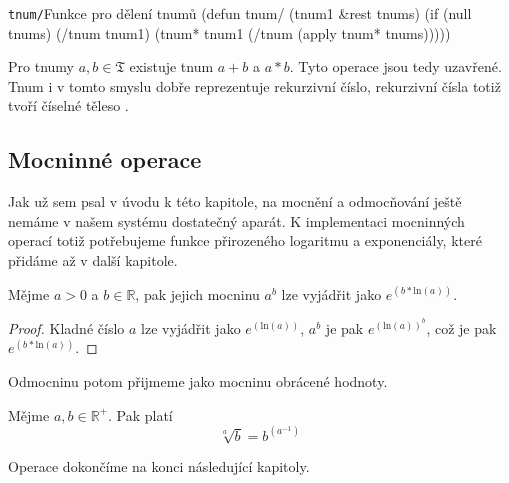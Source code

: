 \begin{lispcode}{\texttt{tnum/}}{Funkce pro dělení tnumů}
(\textcolor{funkcionalni}{defun} \textcolor{pojmenovan}{tnum/} (tnum1 &rest tnums)
  (\textcolor{funkcionalni}{if} (\textcolor{funkcionalni}{null} tnums)
    (\textcolor{moje}{/tnum} tnum1)
    (\textcolor{moje}{tnum*} tnum1 (\textcolor{moje}{/tnum} (\textcolor{funkcionalni}{apply} \textquotesingle\textcolor{moje}{tnum*} tnums)))))
\end{lispcode}

Pro tnumy $a, b\in\mathfrak{T}$ existuje tnum $a+b$ a $a*b$. Tyto operace jsou tedy uzavřené. Tnum i v tomto smyslu dobře reprezentuje rekurzivní číslo, rekurzivní čísla totiž tvoří číselné těleso \cite{rice:kompr}.

\subsection{Mocninné operace}
Jak už sem psal v úvodu k této kapitole, na mocnění a odmocňování ještě nemáme v našem systému dostatečný aparát. K implementaci mocninných operací totiž potřebujeme funkce přirozeného logaritmu a exponenciály, které přidáme až v další kapitole.

\begin{lemma}\label{vet:mocnina_tnumu}
Mějme $a>0$ a $b\in\mathbb{R}$, pak jejich mocninu $a^b$ lze vyjádřit jako $e^{(b*\mathrm{ln}(a))}$.
\begin{proof}
Kladné číslo $a$ lze vyjádřit jako $e^{(\mathrm{ln}(a))}$, $a^b$ je pak $e^{({\mathrm{ln}(a)})^b}$, což je pak $e^{(b*\mathrm{ln}(a))}$.
\end{proof}
\end{lemma}

Odmocninu potom přijmeme jako mocninu obrácené hodnoty.

\begin{fact}\label{fac:odmocnina_tnumu}
Mějme $a, b\in\mathbb{R^+}$. Pak platí
\begin{equation}
\sqrt[a]{b}=b^{(a^{-1})}
\end{equation}
\end{fact}

Operace dokončíme na konci následující kapitoly.

